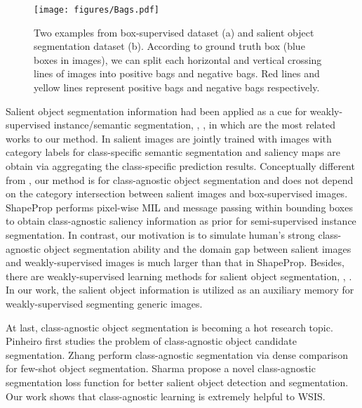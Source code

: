 \documentclass[final]{cvpr}
\begin{document}
\begin{figure}[ht]
\centering
\texttt{[image: figures/Bags.pdf]}
\caption{Two examples from box-supervised dataset (a) and salient object segmentation dataset (b). According to ground truth box (blue boxes in images), we can split each horizontal and vertical crossing lines of images into positive bags and negative bags. Red lines and yellow lines represent positive bags and negative bags respectively.}
\label{fig:bags}
\end{figure}


Salient object segmentation information had been applied as a cue for weakly-supervised instance/semantic segmentation, \eg, \cite{huang2018weakly, fanECCV18GP, zeng2019joint, zhou2020learning}, in which \cite{zeng2019joint,zhou2020learning} are the most related works to our method. In \cite{zeng2019joint} salient images are jointly trained with images with category labels for class-specific semantic segmentation and saliency maps are obtain via aggregating the class-specific prediction results. Conceptually different from \cite{zeng2019joint}, our method is for class-agnostic object segmentation and does not depend on the category intersection between salient images and box-supervised images. ShapeProp \cite{zhou2020learning} performs pixel-wise MIL and message passing within bounding boxes to obtain class-agnostic saliency information as prior for semi-supervised instance segmentation. In contrast, our motivation is to simulate human’s strong class-agnostic object segmentation ability and the domain gap between salient images and weakly-supervised images is much larger than that in ShapeProp. Besides, there are weakly-supervised learning methods for salient object segmentation, \eg, \cite{li2018weakly,zeng2019multi,zhang2020weakly}. In our work, the salient object information is utilized as an auxiliary memory for weakly-supervised segmenting generic images.



At last, class-agnostic object segmentation is becoming a hot research topic. Pinheiro \etal \cite{pinheiro2015learning} first studies the problem of class-agnostic object candidate segmentation. Zhang \etal \cite{zhang2019canet} perform class-agnostic segmentation via dense comparison for few-shot object segmentation. Sharma \etal \cite{sharma2020class} propose a novel class-agnostic segmentation loss function for better salient object detection and segmentation. Our work shows that class-agnostic learning is extremely helpful to WSIS.
\end{document}
